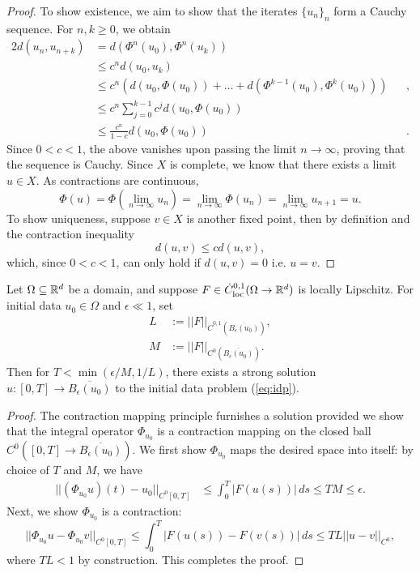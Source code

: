 \begin{proof}
	To show existence, we aim to show that the iterates $\{u_n\}_n$ form a Cauchy sequence. For $n, k \geq 0$, we obtain
		\begin{alignat*}{2}
			 d(u_n, u_{n + k}) 
			 	&= d(\Phi^n (u_0), \Phi^n (u_k))			
			 		&&\\
			 	&\leq c^n d(u_0, u_k) 
			 		&&\\
			 	&\leq c^n \left( d(u_0, \Phi(u_0)) + \dots + d(\Phi^{k - 1} (u_0), \Phi^k (u_0)) \right) 
			 		&&, \\
			 	&\leq 	c^n \sum_{j = 0}^{k - 1} c^j d(u_0, \Phi(u_0))
			 		&& \\
			 	&\leq \frac{c^n}{1 - c} d(u_0, \Phi(u_0))
			 		&&.	
		\end{alignat*}	 
	Since $0 < c < 1$, the above vanishes upon passing the limit $n \to \infty$, proving that the sequence is Cauchy. Since $X$ is complete, we know that there exists a limit $u \in X$. As contractions are continuous, 
		\[ \Phi(u) = \Phi( \lim_{n \to \infty} u_n) = \lim_{n \to \infty} \Phi(u_n) = \lim_{n \to \infty} u_{n + 1} = u.  \]
	To show uniqueness, suppose $v \in X$ is another fixed point, then by definition and the contraction inequality
		\[ d(u, v) \leq cd(u, v), \]	
	which, since $0 < c < 1$, can only hold if $d(u, v) = 0$ i.e. $u = v$. 
\end{proof}

\begin{theorem}
	Let $\Omega \subseteq \mathbb R^d$ be a domain, and suppose $F \in \dot C^{0, 1}_{\mathrm{loc}} (\Omega \to \mathbb R^d)$ is locally Lipschitz. For initial data $u_0 \in \Omega$ and $\epsilon \ll 1$, set
		\begin{align*}
			L
				&:= ||F||_{\dot C^{0, 1} (\overline{B_\epsilon (u_0)})} ,\\
			M
				&:= ||F||_{C^{0} (\overline{B_\epsilon (u_0)})}.	
		\end{align*}
	Then for $T < \min (\epsilon/M, 1/L)$, there exists a strong solution $u: [0, T] \to \overline{B_\epsilon (u_0)}$ to the initial data problem (\ref{eq:idp}). 
\end{theorem}

\begin{proof}
	The contraction mapping principle furnishes a solution provided we show that the integral operator $\Phi_{u_0}$ is a contraction mapping on the closed ball $C^0 ([0, T] \to \overline{B_\epsilon (u_0)})$. We first show $\Phi_{u_0}$ maps the desired space into itself: by choice of $T$ and $M$, we have 
		\begin{align*}
			 ||(\Phi_{u_0} u)(t) - u_0||_{C^0 [0, T]} 
			 	&\leq \int_0^T |F(u(s))| \, ds \leq TM \leq \epsilon. 
		\end{align*}
	Next, we show $\Phi_{u_0}$ is a contraction: 
		\[ ||\Phi_{u_0} u - \Phi_{u_0} v||_{C^0 [0, T]} \leq  \int_0^T |F(u(s)) - F(v(s))| \, ds \leq T L ||u - v||_{C^0}, \]
	where $TL < 1$ by construction. This completes the proof.
\end{proof}

